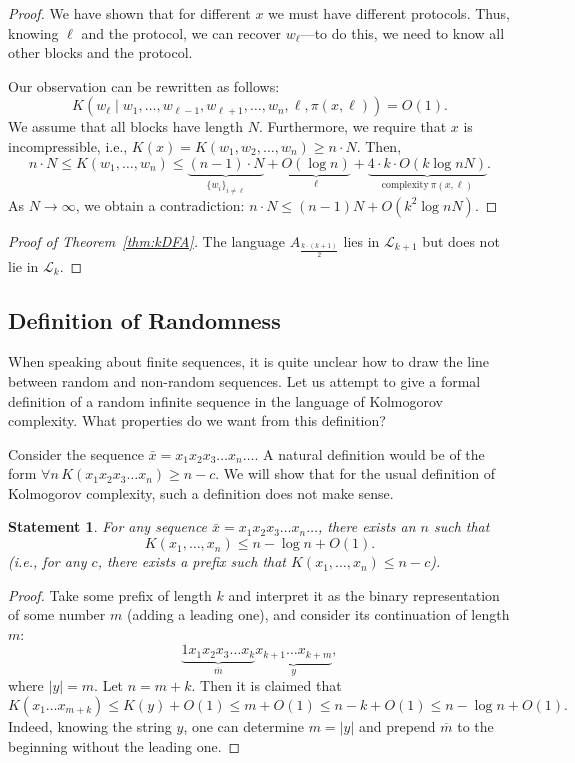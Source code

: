 \documentclass[12pt,sans]{article}
\theoremstyle{definition}
\theoremstyle{plain}
\newtheorem{statement}{Statement}[section]
\theoremstyle{remark}
\begin{document}
\begin{proof}
    We have shown that for different $x$ we must have different protocols. Thus, knowing $\ell$ and the protocol, we can recover $w_\ell$—to do this, we need to know all other blocks and the protocol.

    Our observation can be rewritten as follows:
    \[
    K(w_\ell \mid w_1,\dots,w_{\ell-1},w_{\ell+1},\dotsc,w_n,\ell,\pi(x,\ell)) = O(1).
    \]
    We assume that all blocks have length $N$. Furthermore, we require that $x$ is incompressible, i.e., $K(x) = K(w_1,w_2,\dotsc,w_n) \ge n \cdot N$.
    Then,
    \[
    n \cdot N \le K(w_1,\dotsc,w_n) \le
    \underbrace{(n-1) \cdot N}_{\{w_i\}_{i \neq \ell}} +
    \underbrace{O(\log n)}_{\ell} +
    \underbrace{4 \cdot k \cdot O(k \log n N)}_{\text{complexity}\ \pi(x,\ell)}.
    \]
    As $N \to \infty$, we obtain a contradiction: $n \cdot N \le (n-1)N + O(k^2 \log n N)$.
\end{proof}

\begin{proof}[Proof of Theorem~\ref{thm:kDFA}]
    The language $A_{\frac{k \cdot (k + 1)}{2}}$ lies in $\mathcal{L}_{k+1}$ but does not lie in $\mathcal{L}_k$.
\end{proof}

\subsection{Definition of Randomness}
When speaking about finite sequences, it is quite unclear how to draw the line between random and non-random sequences. Let us attempt to give a formal definition of a random infinite sequence in the language of Kolmogorov complexity. What properties do we want from this definition?

Consider the sequence $\bar{x} = x_1 x_2 x_3 \dotso x_n \dotso$. A natural definition would be of the form $\forall n \, K(x_1 x_2 x_3 \dotso x_n) \ge n - c$. We will show that for the usual definition of Kolmogorov complexity, such a definition does not make sense.

\begin{statement}
    For any sequence $\bar{x} = x_1 x_2 x_3 \dotso x_n \dotso$, there exists an $n$ such that
    \[
    K(x_1, \dotsc, x_n) \le n - \log n + O(1).
    \]
    (i.e., for any $c$, there exists a prefix such that $K(x_1, \dotsc, x_n) \le n - c$).
\end{statement}
\begin{proof}
    Take some prefix of length $k$ and interpret it as the binary representation of some number $m$ (adding a leading one), and consider its continuation of length $m$:
    \[
    \underbrace{1 x_1 x_2 x_3 \dotso x_k}_{\overline{m}}
    \underbrace{x_{k+1} \dotso x_{k + m}}_y,
    \]
    where $|y| = m$. Let $n = m + k$. Then it is claimed that
    \[
    K(x_1 \dotso x_{m+k}) \le K(y) + O(1) \le m + O(1) \le n - k + O(1) \le n - \log n + O(1).
    \]
    Indeed, knowing the string $y$, one can determine $m = |y|$ and prepend $\overline{m}$ to the beginning without the leading one.
\end{proof}
\end{document}
